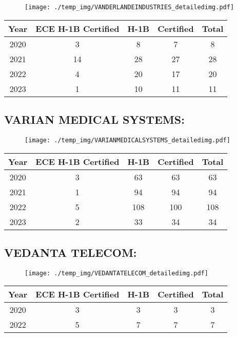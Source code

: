 \documentclass{article}%
\begin{document}
\begin{figure}[htbp]%
\centering%
\texttt{[image: ./temp\_img/VANDERLANDEINDUSTRIES\_detailedimg.pdf]}%
\end{figure}

%
\begin{longtable}{c|c|c|c|c}%
\hline%
Year&ECE H{-}1B Certified&H{-}1B&Certified&Total\\%
\hline%
2020&3&8&7&8\\%
\hline%
2021&14&28&27&28\\%
\hline%
2022&4&20&17&20\\%
\hline%
2023&1&10&11&11\\%
\hline%
\end{longtable}

%
\newpage%
\subsection{VARIAN MEDICAL SYSTEMS:}%
\label{subsec:VARIANMEDICALSYSTEMS}%
\label{VARIANMEDICALSYSTEMSdetailed}%


\begin{figure}[htbp]%
\centering%
\texttt{[image: ./temp\_img/VARIANMEDICALSYSTEMS\_detailedimg.pdf]}%
\end{figure}

%
\begin{longtable}{c|c|c|c|c}%
\hline%
Year&ECE H{-}1B Certified&H{-}1B&Certified&Total\\%
\hline%
2020&3&63&63&63\\%
\hline%
2021&1&94&94&94\\%
\hline%
2022&5&108&100&108\\%
\hline%
2023&2&33&34&34\\%
\hline%
\end{longtable}

%
\newpage%
\subsection{VEDANTA TELECOM:}%
\label{subsec:VEDANTATELECOM}%
\label{VEDANTATELECOMdetailed}%


\begin{figure}[htbp]%
\centering%
\texttt{[image: ./temp\_img/VEDANTATELECOM\_detailedimg.pdf]}%
\end{figure}

%
\begin{longtable}{c|c|c|c|c}%
\hline%
Year&ECE H{-}1B Certified&H{-}1B&Certified&Total\\%
\hline%
2020&3&3&3&3\\%
\hline%
2022&5&7&7&7\\%
\hline%
\end{longtable}
\end{document}
